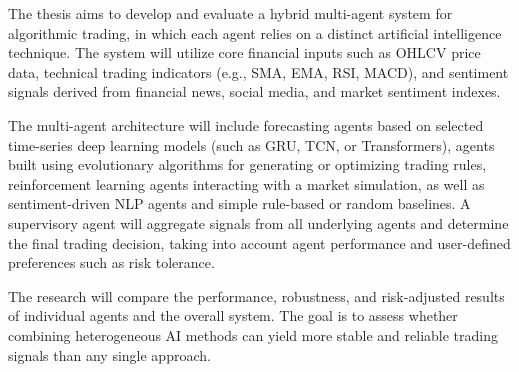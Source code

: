 The thesis aims to develop and evaluate a hybrid multi-agent system for algorithmic trading, in which each agent relies on a distinct artificial intelligence technique. The system will utilize core financial inputs such as OHLCV price data, technical trading indicators (e.g., SMA, EMA, RSI, MACD), and sentiment signals derived from financial news, social media, and market sentiment indexes.

\vspace{3mm}
 
The multi-agent architecture will include forecasting agents based on selected time-series deep learning models (such as GRU, TCN, or Transformers), agents built using evolutionary algorithms for generating or optimizing trading rules, reinforcement learning agents interacting with a market simulation, as well as sentiment-driven NLP agents and simple rule-based or random baselines. A supervisory agent will aggregate signals from all underlying agents and determine the final trading decision, taking into account agent performance and user-defined preferences such as risk tolerance.

\vspace{3mm}

The research will compare the performance, robustness, and risk-adjusted results of individual agents and the overall system. The goal is to assess whether combining heterogeneous AI methods can yield more stable and reliable trading signals than any single approach.


